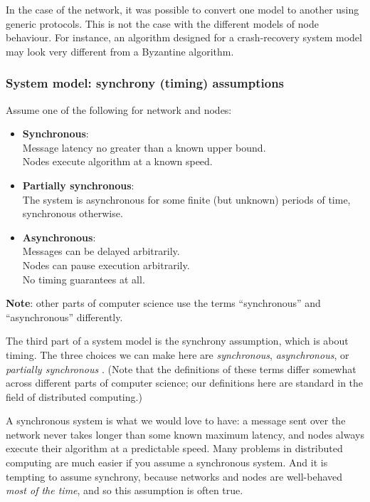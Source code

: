 In the case of the network, it was possible to convert one model to another using generic protocols.
This is not the case with the different models of node behaviour.
For instance, an algorithm designed for a crash-recovery system model may look very different from a Byzantine algorithm.

\begin{frame}
    \label{s:model-synchrony}
    \frametitle{System model: synchrony (timing) assumptions}
    Assume one of the following for network and nodes:
    \begin{itemize}
        \item \textbf{Synchronous}:\\
            Message latency no greater than a known upper bound.\\
            Nodes execute algorithm at a known speed.\pause
        \item \textbf{Partially synchronous}:\\
            The system is asynchronous for some finite (but unknown) periods of time, synchronous otherwise.\pause
        \item \textbf{Asynchronous}:\\
            Messages can be delayed arbitrarily.\\
            Nodes can pause execution arbitrarily.\\
            No timing guarantees at all.\\[1em]
    \end{itemize}
    \textbf{Note}: other parts of computer science use the terms ``synchronous'' and ``asynchronous'' differently.
\end{frame}
\label{l:model-synchrony}

The third part of a system model is the synchrony assumption, which is about timing.
The three choices we can make here are \emph{synchronous}, \emph{asynchronous}, or \emph{partially synchronous} \citep{Dwork:1988dr}.
(Note that the definitions of these terms differ somewhat across different parts of computer science; our definitions here are standard in the field of distributed computing.)

A synchronous system is what we would love to have: a message sent over the network never takes longer than some known maximum latency, and nodes always execute their algorithm at a predictable speed.
Many problems in distributed computing are much easier if you assume a synchronous system.
And it is tempting to assume synchrony, because networks and nodes are well-behaved \emph{most of the time}, and so this assumption is often true.

